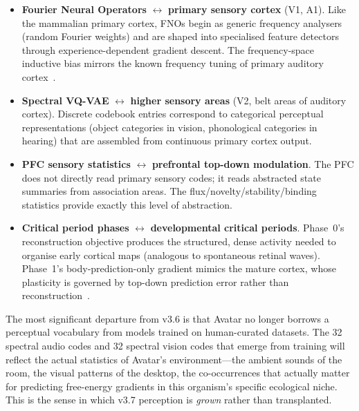 \begin{itemize}
    \item \textbf{Fourier Neural Operators} $\leftrightarrow$ \textbf{primary sensory
        cortex} (V1, A1).
        Like the mammalian primary cortex, FNOs begin as generic frequency analysers
        (random Fourier weights) and are shaped into specialised feature detectors
        through experience-dependent gradient descent.
        The frequency-space inductive bias mirrors the known frequency tuning of
        primary auditory cortex~\cite{damasio1999}.
    \item \textbf{Spectral VQ-VAE} $\leftrightarrow$ \textbf{higher sensory areas}
        (V2, belt areas of auditory cortex).
        Discrete codebook entries correspond to categorical perceptual representations
        (object categories in vision, phonological categories in hearing) that are
        assembled from continuous primary cortex output.
    \item \textbf{PFC sensory statistics} $\leftrightarrow$ \textbf{prefrontal
        top-down modulation}.
        The PFC does not directly read primary sensory codes; it reads abstracted
        state summaries from association areas.
        The flux/novelty/stability/binding statistics provide exactly this level of
        abstraction.
    \item \textbf{Critical period phases} $\leftrightarrow$ \textbf{developmental
        critical periods}.
        Phase~0's reconstruction objective produces the structured, dense activity
        needed to organise early cortical maps (analogous to spontaneous retinal
        waves).
        Phase~1's body-prediction-only gradient mimics the mature cortex, whose
        plasticity is governed by top-down prediction error rather than
        reconstruction~\cite{friston2010}.
\end{itemize}

The most significant departure from v3.6 is that Avatar no longer borrows a
perceptual vocabulary from models trained on human-curated datasets.
The 32 spectral audio codes and 32 spectral vision codes that emerge from training
will reflect the actual statistics of Avatar's environment---the ambient sounds of
the room, the visual patterns of the desktop, the co-occurrences that actually
matter for predicting free-energy gradients in this organism's specific ecological
niche.
This is the sense in which v3.7 perception is \emph{grown} rather than transplanted.

